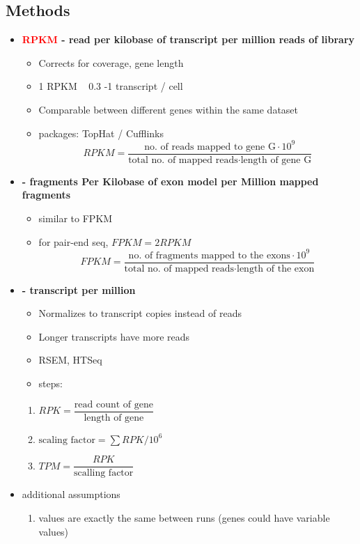 \documentclass[font=12pt]{article}
\begin{document}
\subsection{Methods}
\begin{itemize}
	\item \textbf{\textcolor{red}{RPKM} - read per kilobase of transcript per million reads of library}
	\begin{itemize}
		\item Corrects for coverage, gene length
		\item 1 RPKM ~ 0.3 -1 transcript / cell
		\item Comparable between different genes within the same dataset
		\item packages: TopHat / Cufflinks
		\[ RPKM = \frac{\text{no. of reads mapped to gene G} \cdot 10^9 }{\text{total no. of mapped reads} \cdot \text{length of gene G}}\]
	\end{itemize}
	\item \textbf{ - fragments Per Kilobase of exon model per Million mapped fragments}
	\begin{itemize}
		\item similar to FPKM
		\item for pair-end seq, $ FPKM = 2 RPKM $
		\[ FPKM = \frac{\text{no. of fragments mapped to the exons} \cdot 10^9 }{\text{total no. of mapped reads} \cdot \text{length of the exon}}\]
	\end{itemize}
	\item \textbf{ - transcript per million}
	\begin{itemize}
		\item Normalizes to transcript copies instead of reads 
		\item Longer transcripts have more reads
		\item RSEM, HTSeq
		\item steps:
	\end{itemize}
	\begin{enumerate}
		\item $ RPK = \dfrac{\text{read count of gene}}{\text{length of gene}} $
		\item $ \text{scaling factor} = \sum RPK / 10^6 $
		\item $ TPM = \dfrac{RPK}{\text{scalling factor}} $
	\end{enumerate}
	\item additional assumptions
	\begin{enumerate}
		\item values are exactly the same between runs (genes could have variable values)\\

\end{enumerate}
\end{itemize}
\end{document}
